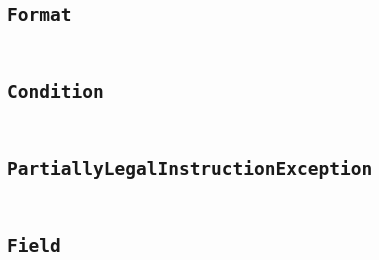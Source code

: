 \documentclass[a4paper]{article}
\begin{document}
\begin{appendix}
    \begin{landscape}
    \section{\texttt{Format}}\label{code:Format}
    \begin{multicols}{2} %
    \inputminted[mathescape,
        linenos,
        numbersep=5pt,
        frame=none,
        framesep=2mm,
        fontsize=\footnotesize]{java}{../src/main/java/se/filipallberg/dark/mips32decompiler/instruction/util/Format.java}
    \end{multicols}
    \end{landscape}
    


    \begin{landscape}
    \section{\texttt{Condition}}\label{code:Condition}
    \begin{multicols}{2} %
    \inputminted[mathescape,
        linenos,
        numbersep=5pt,
        frame=none,
        framesep=2mm,
        fontsize=\footnotesize]{java}{../src/main/java/se/filipallberg/dark/mips32decompiler/instruction/Condition.java}
    \end{multicols}
    \end{landscape}
    


    \begin{landscape}
    \section{\texttt{PartiallyLegalInstructionException}}\label{code:PartiallyLegalInstructionException}
    \begin{multicols}{2} %
    \inputminted[mathescape,
        linenos,
        numbersep=5pt,
        frame=none,
        framesep=2mm,
        fontsize=\footnotesize]{java}{../src/main/java/se/filipallberg/dark/mips32decompiler/instruction/PartiallyLegalInstructionException.java}
    \end{multicols}
    \end{landscape}
    


    \begin{landscape}
    \section{\texttt{Field}}\label{code:Field}
    \begin{multicols}{2} %
    \inputminted[mathescape,
        linenos,
        numbersep=5pt,
        frame=none,
        framesep=2mm,
        fontsize=\footnotesize]{java}{../src/main/java/se/filipallberg/dark/mips32decompiler/instruction/type/RTypeInstruction/Field.java}
    \end{multicols}
    \end{landscape}
    



\end{appendix}
\end{document}
